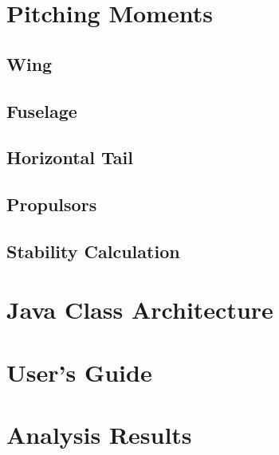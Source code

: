 \section{Pitching Moments}
\subsection{Wing}
\subsection{Fuselage}
\subsection{Horizontal Tail}
\subsection{Propulsors}

\subsection{Stability Calculation}


\section{Java Class Architecture}

\section{User's Guide}

\section{Analysis Results} %
